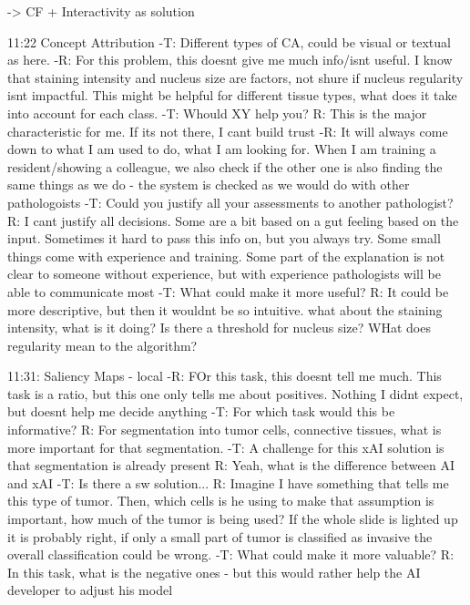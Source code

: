 -> CF + Interactivity as solution

11:22 Concept Attribution
-T: Different types of CA, could be visual or textual as here.
-R: For this problem, this doesnt give me much info/isnt useful. I know that staining intensity and nucleus size are factors, not shure if nucleus regularity isnt impactful. This might be helpful for different tissue types, what does it take into account for each class.
-T: Whould XY help you? R: This is the major characteristic for me. If its not there, I cant build trust
-R: It will always come down to what I am used to do, what I am looking for. When I am training a resident/showing a colleague, we also check if the other one is also finding the same things as we do - the system is checked as we would do with other pathologoists
-T: Could you justify all your assessments to another pathologist? R: I cant justify all decisions. Some are a bit based on a gut feeling based on the input. Sometimes it hard to pass this info on, but you always try. Some small things come with experience and training. Some part of the explanation is not clear to someone without experience, but with experience pathologists will be able to communicate most
-T: What could make it more useful? R: It could be more descriptive, but then it wouldnt be so intuitive. what about the staining intensity, what is it doing? Is there a threshold for nucleus size? WHat does regularity mean to the algorithm?

11:31: Saliency Maps - local
-R: FOr this task, this doesnt tell me much. This task is a ratio, but this one only tells me about positives. Nothing I didnt expect, but doesnt help me decide anything
-T: For which task would this be informative? R: For segmentation into tumor cells, connective tissues, what is more important for that segmentation.
-T: A challenge for this xAI solution is that segmentation is already present R: Yeah, what is the difference between AI and xAI
-T: Is there a sw solution... R: Imagine I have something that tells me this type of tumor. Then, which cells is he using to make that assumption is important, how much of the tumor is being used? If the whole slide is lighted up it is probably right, if only a small part of tumor is classified as invasive the overall classification could be wrong.
-T: What could make it more valuable? R: In this task, what is the negative ones - but this would rather help the AI developer to adjust his model

